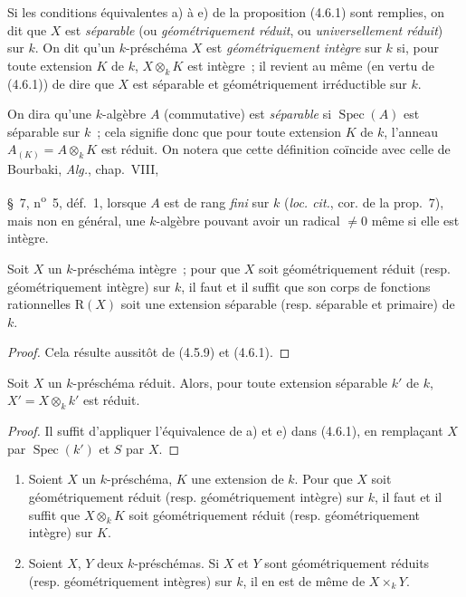 \begin{definition}[4.6.2]
\label{IV.2.4.6.2-fr}
Si les conditions équivalentes a) à e) de la proposition (4.6.1) sont
remplies, on dit que $X$ est \emph{séparable} (ou \emph{géométriquement réduit},
ou \emph{universellement réduit}) sur $k$. On dit qu'un $k$-préschéma $X$ est
\emph{géométriquement intègre} sur $k$ si, pour toute extension $K$ de $k$,
$X\otimes_k K$ est intègre~; il revient au même (en vertu de (4.6.1)) de dire
que $X$ est séparable et géométriquement irréductible sur $k$.
\end{definition}

On dira qu'une $k$-algèbre $A$ (commutative) est \emph{séparable} si
$\operatorname{Spec}(A)$ est séparable sur $k$~; cela signifie donc que pour
toute extension $K$ de $k$, l'anneau $A_{(K)}=A\otimes_k K$ est réduit. On
notera que cette définition coïncide avec celle de Bourbaki, \emph{Alg.},
chap.~VIII,


\S~7, n\textsuperscript{o}~5, déf.~1, lorsque $A$ est de rang \emph{fini} sur
$k$ (\emph{loc. cit.}, cor. de la prop.~7), mais non en général, une $k$-algèbre
pouvant avoir un radical $\neq0$ même si elle est intègre.

\begin{corollary}[4.6.3]
\label{IV.2.4.6.3-fr}
Soit $X$ un $k$-préschéma intègre~; pour que $X$ soit géométriquement réduit
(resp. géométriquement intègre) sur $k$, il faut et il suffit que son corps de
fonctions rationnelles $\mathrm R(X)$ soit une extension séparable (resp.
séparable et primaire) de $k$.
\end{corollary}

\begin{proof}
Cela résulte aussitôt de (4.5.9) et (4.6.1).
\end{proof}

\begin{corollary}[4.6.4]
\label{IV.2.4.6.4-fr}
Soit $X$ un $k$-préschéma réduit. Alors, pour toute extension séparable $k'$ de
$k$, $X'=X\otimes_k k'$ est réduit.
\end{corollary}

\begin{proof}
Il suffit d'appliquer l'équivalence de a) et e) dans (4.6.1), en remplaçant
$X$ par $\operatorname{Spec}(k')$ et $S$ par $X$.
\end{proof}

\begin{proposition}[4.6.5]
\label{IV.2.4.6.5-fr}
\begin{enumerate}
\item[(i)] Soient $X$ un $k$-préschéma, $K$ une extension de $k$. Pour que $X$
soit géométriquement réduit (resp. géométriquement intègre) sur $k$, il faut et
il suffit que $X\otimes_k K$ soit géométriquement réduit (resp. géométriquement
intègre) sur $K$.
\item[(ii)] Soient $X$, $Y$ deux $k$-préschémas. Si $X$ et $Y$ sont
géométriquement réduits (resp. géométriquement intègres) sur $k$, il en est de
même de $X\times_k Y$.
\end{enumerate}
\end{proposition}

